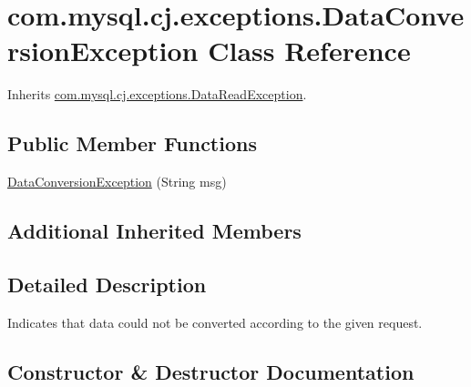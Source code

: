 \hypertarget{classcom_1_1mysql_1_1cj_1_1exceptions_1_1_data_conversion_exception}{}\section{com.\+mysql.\+cj.\+exceptions.\+Data\+Conversion\+Exception Class Reference}
\label{classcom_1_1mysql_1_1cj_1_1exceptions_1_1_data_conversion_exception}


Inherits \mbox{\hyperlink{classcom_1_1mysql_1_1cj_1_1exceptions_1_1_data_read_exception}{com.\+mysql.\+cj.\+exceptions.\+Data\+Read\+Exception}}.

\subsection*{Public Member Functions}
\begin{DoxyCompactItemize}
\item 
\mbox{\hyperlink{classcom_1_1mysql_1_1cj_1_1exceptions_1_1_data_conversion_exception_a6e03fb675925b05963e06649b68aea34}{Data\+Conversion\+Exception}} (String msg)
\end{DoxyCompactItemize}
\subsection*{Additional Inherited Members}


\subsection{Detailed Description}
Indicates that data could not be converted according to the given request. 

\subsection{Constructor \& Destructor Documentation}
\mbox{\label{classcom_1_1mysql_1_1cj_1_1exceptions_1_1_data_conversion_exception_a6e03fb675925b05963e06649b68aea34}} 
